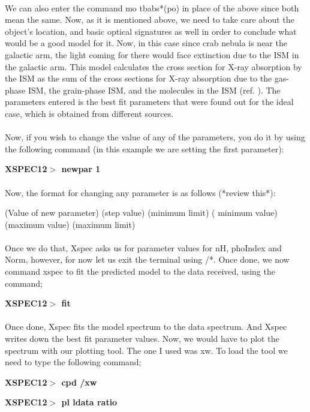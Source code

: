 \documentclass[a4paper,twoside]{report}
\numberwithin{equation}{section}
\begin{document}
\paragraph{}
We can also enter the command mo tbabs*(po) in place of the above since both mean the same. Now, as it is mentioned above, we need to take care about the object's location, and basic optical signatures as well in order to conclude what would be a good model for it. Now, in this case since crab nebula is near the galactic arm, the light coming for there would face extinction due to the ISM in the galactic arm. This model calculates the cross section for X-ray absorption by the ISM as the sum of the cross sections for X-ray absorption due to the gas-phase ISM, the grain-phase ISM, and the molecules in the ISM (ref. ). The parameters entered is the best fit parameters that were found out for the ideal case, which is obtained from different sources. 
\paragraph{}
Now, if you wish to change the value of any of the parameters, you do it by using the following command (in this example we are setting the first parameter):
\begin{center}
\item \large \textbf{XSPEC12$>$ newpar 1}
\end{center}
\paragraph{}
Now, the format for changing any parameter is as follows (*review this*):
\begin{center}
\item \large (Value of new parameter) (step value) (minimum limit) ( minimum value) (maximum value) (maximum limit)
\end{center}
\paragraph{}
Once we do that, Xspec asks us for parameter values for nH, phoIndex and Norm, however, for now let us exit the terminal using /*. Once done, we now command xspec to fit the predicted model to the data received, using the command;
\begin{center}
\item \large \textbf{XSPEC12$>$ fit}
\end{center}
\paragraph{}
Once done, Xspec fits the model spectrum to the data spectrum. And Xspec writes down the best fit parameter values. Now, we would have to plot the spectrum with our plotting tool. The one I used was xw. To load the tool we need to type the following command; 
\begin{center}
\item \large \textbf{XSPEC12$>$ cpd /xw}
\item \large \textbf{XSPEC12$>$ pl ldata ratio}
\end{center}
\end{document}
